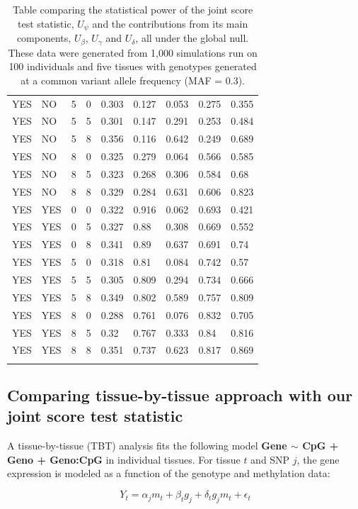 \documentclass[hidelinks]{article}
\begin{document}
\begin{longtable}{lllllllll}
YES & NO & 5 & 0 & 0.303 & 0.127 & 0.053 & 0.275 & 0.355 \\
YES & NO & 5 & 5 & 0.301 & 0.147 & 0.291 & 0.253 & 0.484 \\
YES & NO & 5 & 8 & 0.356 & 0.116 & 0.642 & 0.249 & 0.689 \\
YES & NO & 8 & 0 & 0.325 & 0.279 & 0.064 & 0.566 & 0.585 \\
YES & NO & 8 & 5 & 0.323 & 0.268 & 0.306 & 0.584 & 0.68 \\
YES & NO & 8 & 8 & 0.329 & 0.284 & 0.631 & 0.606 & 0.823 \\	\hdashline
YES & YES & 0 & 0 & 0.322 & 0.916 & 0.062 & 0.693 & 0.421 \\
YES & YES & 0 & 5 & 0.327 & 0.88 & 0.308 & 0.669 & 0.552 \\
YES & YES & 0 & 8 & 0.341 & 0.89 & 0.637 & 0.691 & 0.74 \\
YES & YES & 5 & 0 & 0.318 & 0.81 & 0.084 & 0.742 & 0.57 \\
YES & YES & 5 & 5 & 0.305 & 0.809 & 0.294 & 0.734 & 0.666 \\
YES & YES & 5 & 8 & 0.349 & 0.802 & 0.589 & 0.757 & 0.809 \\
YES & YES & 8 & 0 & 0.288 & 0.761 & 0.076 & 0.832 & 0.705 \\
YES & YES & 8 & 5 & 0.32 & 0.767 & 0.333 & 0.84 & 0.816 \\
YES & YES & 8 & 8 & 0.351 & 0.737 & 0.623 & 0.817 & 0.869 \\
\hline \hline
\caption{Table comparing the statistical power of the joint score test statistic, $U_\psi$ and the contributions from its main components, $U_\beta$, $U_\gamma$ and $U_\delta$, all under the global null. These data were generated from 1,000 simulations run on 100 individuals and five tissues with genotypes generated at a common variant allele frequency (MAF = 0.3). }
\end{longtable}

\subsection{Comparing tissue-by-tissue approach with our joint score test statistic}

A tissue-by-tissue (TBT) analysis fits the following model \textbf{Gene $\sim$ CpG + Geno + Geno:CpG} in individual tissues. For tissue $t$ and SNP $j$, the gene expression is modeled as a function of the genotype and methylation data:

\begingroup
\large
\begin{equation}
Y_{t} =  \alpha_j m_{t} + \beta_t g_j + \delta_t g_j m_{t} + \epsilon_t
\end{equation}
\endgroup
\end{document}
